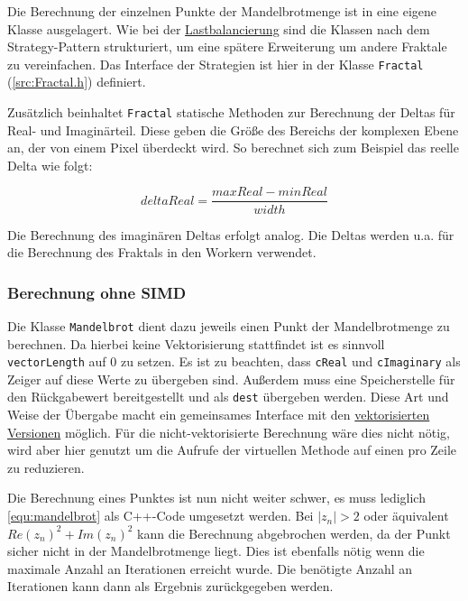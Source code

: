 Die Berechnung der einzelnen Punkte der Mandelbrotmenge ist in eine eigene Klasse ausgelagert.
Wie bei der \hyperref[sec:load_balancing]{Lastbalancierung} sind die Klassen nach dem Strategy-Pattern strukturiert, um eine spätere Erweiterung um andere Fraktale zu vereinfachen.
Das Interface der Strategien ist hier in der Klasse \verb|Fractal| (\autoref{src:Fractal.h}) definiert.

\begin{figure}
	
\end{figure}

Zusätzlich beinhaltet \verb|Fractal| statische Methoden zur Berechnung der Deltas für Real- und Imaginärteil.
Diese geben die Größe des Bereichs der komplexen Ebene an, der von einem Pixel überdeckt wird.
So berechnet sich zum Beispiel das reelle Delta wie folgt:

\begin{equation*}
	deltaReal = \frac{maxReal - minReal}{width}
\end{equation*}

Die Berechnung des imaginären Deltas erfolgt analog.
Die Deltas werden u.a. für die Berechnung des Fraktals in den Workern verwendet.

\subsubsection{Berechnung ohne SIMD}

Die Klasse \verb|Mandelbrot| dient dazu jeweils einen Punkt der Mandelbrotmenge zu berechnen.
Da hierbei keine Vektorisierung stattfindet ist es sinnvoll \verb|vectorLength| auf 0 zu setzen.
Es ist zu beachten, dass \verb|cReal| und \verb|cImaginary| als Zeiger auf diese Werte zu übergeben sind.
Außerdem muss eine Speicherstelle für den Rückgabewert bereitgestellt und als \verb|dest| übergeben werden.
Diese Art und Weise der Übergabe macht ein gemeinsames Interface mit den \hyperref[subsec:simd]{vektorisierten Versionen} möglich.
Für die nicht-vektorisierte Berechnung wäre dies nicht nötig, wird aber hier genutzt um die Aufrufe der virtuellen Methode auf einen pro Zeile zu reduzieren.

Die Berechnung eines Punktes ist nun nicht weiter schwer, es muss lediglich \autoref{equ:mandelbrot} als C++-Code umgesetzt werden.
Bei $|z_n| > 2$ oder äquivalent $Re(z_n)^2 + Im(z_n)^2$ kann die Berechnung abgebrochen werden, da der Punkt sicher nicht in der Mandelbrotmenge liegt.
Dies ist ebenfalls nötig wenn die maximale Anzahl an Iterationen erreicht wurde.
Die benötigte Anzahl an Iterationen kann dann als Ergebnis zurückgegeben werden.

